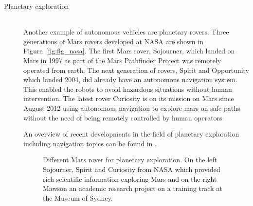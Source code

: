 \begin{description}
\item[Planetary exploration]\hfill \\
Another example of autonomous vehicles are planetary rovers.
Three generations of Mars rovers developed at NASA are shown in Figure~\ref{fig:fig_nasa}. 
The first Mars rover, Sojourner, which landed on Mars in 1997 as part of the Mars Pathfinder Project was remotely operated from earth. 
The next generation of rovers, Spirit and Opportunity which landed 2004, did already have an autonomous navigation system. This enabled the robots to avoid hazardous situations without human intervention. 
The latest rover Curiosity is on its mission on Mars since August 2012 using autonomous navigation to explore mars on safe paths without the need of being remotely controlled by human operators.

An overview of recent developments in the field of planetary exploration including navigation topics can be found in \cite{PavoneAcikmese2014rover}.

\begin{figure}[thpb]
	  \myfloatalign
      \footnotesize
      \centering
   \caption[Mars rover]{Different Mars rover for planetary exploration. On the left Sojourner, Spirit and Curiosity from NASA which provided rich scientific information exploring Mars and on the right Mawson an academic research project on a training track at the Museum of Sydney.}
   \label{fig:fig_rovers}
\end{figure}


\end{description}

